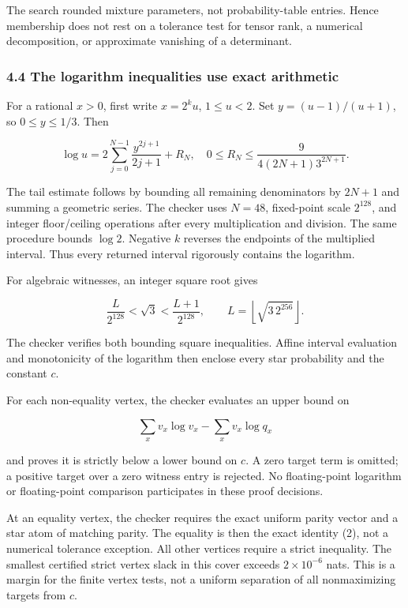The search rounded mixture parameters, not probability-table entries.
Hence membership does not rest on a tolerance test for tensor rank, a
numerical decomposition, or approximate vanishing of a determinant.

\subsubsection{4.4 The logarithm inequalities use exact
arithmetic}\label{the-logarithm-inequalities-use-exact-arithmetic}

For a rational \(x>0\), first write \(x=2^k u\), \(1\le u<2\). Set
\(y=(u-1)/(u+1)\), so \(0\le y\le1/3\). Then

\[
\log u=2\sum_{j=0}^{N-1}\frac{y^{2j+1}}{2j+1}+R_N,
\quad
0\le R_N\le\frac{9}{4(2N+1)3^{2N+1}}.
\tag{11}
\]

The tail estimate follows by bounding all remaining denominators by
\(2N+1\) and summing a geometric series. The checker uses \(N=48\),
fixed-point scale \(2^{128}\), and integer floor/ceiling operations
after every multiplication and division. The same procedure bounds
\(\log2\). Negative \(k\) reverses the endpoints of the multiplied
interval. Thus every returned interval rigorously contains the
logarithm.

For algebraic witnesses, an integer square root gives

\[
\frac{L}{2^{128}}<\sqrt3<\frac{L+1}{2^{128}},
\qquad L=\left\lfloor\sqrt{3\,2^{256}}\right\rfloor.
\]

The checker verifies both bounding square inequalities. Affine interval
evaluation and monotonicity of the logarithm then enclose every star
probability and the constant \(c\).

For each non-equality vertex, the checker evaluates an upper bound on

\[
\sum_xv_x\log v_x-\sum_xv_x\log q_x
\]

and proves it is strictly below a lower bound on \(c\). A zero target
term is omitted; a positive target over a zero witness entry is
rejected. No floating-point logarithm or floating-point comparison
participates in these proof decisions.

At an equality vertex, the checker requires the exact uniform parity
vector and a star atom of matching parity. The equality is then the
exact identity (2), not a numerical tolerance exception. All other
vertices require a strict inequality. The smallest certified strict
vertex slack in this cover exceeds \(2\times10^{-6}\) nats. This is a
margin for the finite vertex tests, not a uniform separation of all
nonmaximizing targets from \(c\).

